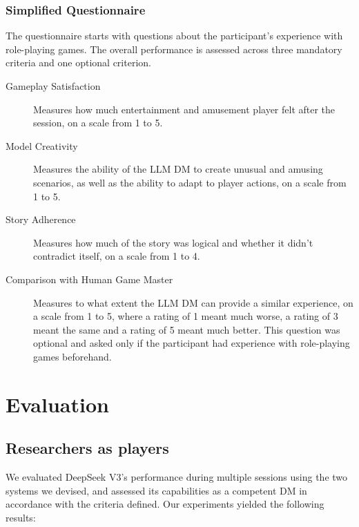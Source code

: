 \documentclass[runningheads]{llncs}
\begin{document}
\subsubsection{Simplified Questionnaire}
The questionnaire starts with questions about the participant's experience with role-playing games. The overall performance is assessed across three mandatory criteria and one optional criterion.

\begin{description}
    \item[Gameplay Satisfaction]
    Measures how much entertainment and amusement player felt after the session, on a scale from 1 to 5.
    \item[Model Creativity]
    Measures the ability of the LLM DM to create unusual and amusing scenarios, as well as the ability to adapt to player actions, on a scale from 1 to 5.
    \item[Story Adherence]
    Measures how much of the story was logical and whether it didn't contradict itself, on a scale from 1 to 4.
    \item[Comparison with Human Game Master]
    Measures to what extent the LLM DM can provide a similar experience, on a scale from 1 to 5, where a rating of 1 meant much worse, a rating of 3 meant the same and a rating of 5 meant much better. This question was optional and asked only if the participant had experience with role-playing games beforehand.
\end{description}

\section{Evaluation}
\subsection{Researchers as players}
We evaluated DeepSeek V3's performance during multiple sessions using the two systems we devised, and assessed its capabilities as a competent DM in accordance with the criteria defined. Our experiments yielded the following results:
\end{document}
